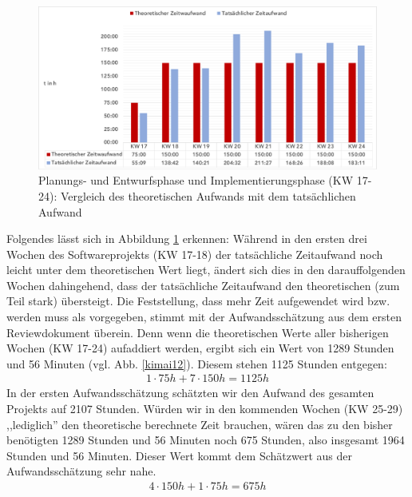 \documentclass[../review_3.tex]{subfiles}
\begin{document}
\begin{figure} [h]
    \centering
    \includegraphics[width = \linewidth]{img/kimai8.pdf}
    \caption{Planungs- und Entwurfsphase und Implementierungsphase (KW 17-24): Vergleich des theoretischen Aufwands mit dem tatsächlichen Aufwand}
    \label{kimai8}
\end{figure}
Folgendes lässt sich in Abbildung \ref{kimai8} erkennen:
Während in den ersten drei Wochen des Softwareprojekts (KW 17-18) der tatsächliche Zeitaufwand noch leicht unter dem theoretischen Wert liegt, ändert sich dies in den darauffolgenden Wochen dahingehend, dass der tatsächliche Zeitaufwand den theoretischen (zum Teil stark) übersteigt.
Die Feststellung, dass mehr Zeit aufgewendet wird bzw. werden muss als vorgegeben,  stimmt mit der Aufwandsschätzung aus dem ersten Reviewdokument überein.
Denn wenn die theoretischen Werte aller bisherigen Wochen (KW 17-24) aufaddiert werden, ergibt sich ein Wert von 1289 Stunden und 56 Minuten (vgl. Abb. \ref{kimai12}). Diesem stehen 1125 Stunden entgegen:
\begin{align*}
    1 \cdot 75h+7 \cdot 150h= 1125h
\end{align*}
In der ersten Aufwandsschätzung schätzten wir den Aufwand des gesamten Projekts auf 2107 Stunden.
Würden wir in den kommenden Wochen (KW 25-29) ,,lediglich'' den theoretische berechnete Zeit brauchen, wären das zu den bisher benötigten 1289 Stunden und 56 Minuten noch 675 Stunden, also insgesamt 1964 Stunden und 56 Minuten. Dieser Wert kommt dem Schätzwert aus der Aufwandsschätzung sehr nahe.
\begin {align*}
4 \cdot 150h + 1 \cdot 75h = 675h
\end{align*}
\end{document}

